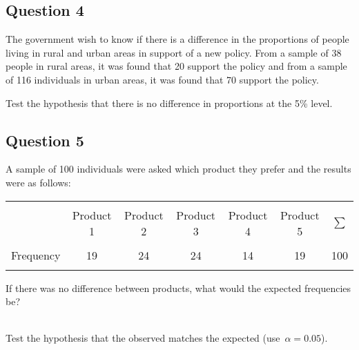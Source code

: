 \documentclass[a4paper,12pt]{article}
\begin{document}
\subsection*{Question 4}
The government wish to know if there is a difference in the proportions of people living in rural and urban areas in support of a new policy. From a sample of 38 people in rural areas, it was found that 20 support the policy and from a sample of 116 individuals in urban areas, it was found that 70 support the policy. \\

\item  Test the hypothesis that there is no difference in proportions at the 5\% level.



\subsection*{Question 5}
A sample of 100 individuals were asked which product they prefer and the results were as follows:  \\
\begin{center}
\begin{tabular}{|c|ccccc|c|}
\hline
&&&&&&\\
 & Product 1 & Product 2 & Product 3 & Product 4 & Product 5 & $\sum$ \\[0.1cm]
\hline
&&&&&&\\
Frequency & 19 & 24 & 24 & 14 & 19 & 100\\[0.1cm]
\hline
\multicolumn{7}{c}{}\\
\end{tabular}
\end{center}

\item  If there was no difference between products, what would the expected frequencies be? 
 
\item \\ Test the hypothesis that the observed matches the expected \mbox{(use $\alpha=0.05$)}.
\end{document}
